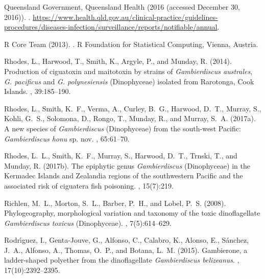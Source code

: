 \documentclass[10pt,letterpaper]{article}
\begin{document}
\begin{thebibliography}{10}
{Queensland Government, Queensland Health} (2016 (accessed December 30, 2016)).
.
\newblock
  \url{https://www.health.qld.gov.au/clinical-practice/guidelines-procedures/diseases-infection/surveillance/reports/notifiable/annual}.

{R Core Team} (2013).
.
\newblock R Foundation for Statistical Computing, Vienna, Austria.

Rhodes, L., Harwood, T., Smith, K., Argyle, P., and Munday, R. (2014).
\newblock Production of ciguatoxin and maitotoxin by strains of
  \emph{Gambierdiscus australes}, \emph{G. pacificus} and \emph{G.
  polynesiensis} ({D}inophyceae) isolated from {R}arotonga, {C}ook {I}slands.
, 39:185--190.

Rhodes, L., Smith, K.~F., Verma, A., Curley, B.~G., Harwood, D.~T., Murray, S.,
  Kohli, G.~S., Solomona, D., Rongo, T., Munday, R., and Murray, S.~A. (2017a).
\newblock A new species of \emph{Gambierdiscus} ({D}inophyceae) from the
  south-west {P}acific: \emph{Gambierdiscus honu} sp. nov.
, 65:61--70.

Rhodes, L.~L., Smith, K.~F., Murray, S., Harwood, D.~T., Trnski, T., and
  Munday, R. (2017b).
\newblock The epiphytic genus \emph{Gambierdiscus} ({D}inophyceae) in the
  {K}ermadec {I}slands and {Z}ealandia regions of the southwestern {P}acific
  and the associated risk of ciguatera fish poisoning.
, 15(7):219.

Richlen, M.~L., Morton, S.~L., Barber, P.~H., and Lobel, P.~S. (2008).
\newblock Phylogeography, morphological variation and taxonomy of the toxic
  dinoflagellate \emph{Gambierdiscus toxicus} ({D}inophyceae).
, 7(5):614--629.

Rodr{\'\i}guez, I., Genta-Jouve, G., Alfonso, C., Calabro, K., Alonso, E.,
  Sánchez, J.~A., Alfonso, A., Thomas, O.~P., and Botana, L.~M. (2015).
\newblock Gambierone, a ladder-shaped polyether from the dinoflagellate
  \emph{Gambierdiscus belizeanus}.
, 17(10):2392--2395.


\end{thebibliography}
\end{document}

